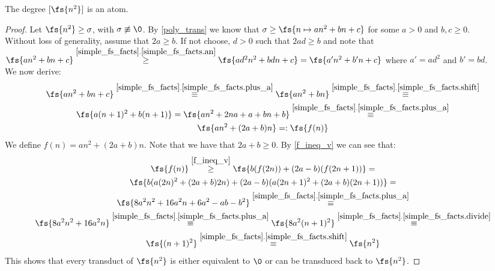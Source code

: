 \begin{theorem}\label{n2_atom}
	The degree $[\fs{n^2}]$ is an atom.
	\begin{proof}
		Let $\fs{n^2} \geq \sigma$, with $\sigma \not\equiv \0$. By \cref{poly_trans} we know that $\sigma \geq \fs{n \mapsto an^2 + bn + c}$ for some $a>0$ and $b,c\geq0$. \\
		
		Without loss of generality, assume that $2a \geq b$. If not choose, $d>0$ such that $2ad \geq b$ and note that $\fs{an^2 + bn+c} \overset{\ref{simple_fs_facts}.\ref{simple_fs_facts.an}}{\geq} \fs{ad^2n^2 + bdn+c} = \fs{a'n^2 + b'n+c}$ where $a' = ad^2$ and $b' = bd$.\\
		
		We now derive:
		\begin{gather*}
			\fs{an^2 + bn + c} \overset{\ref{simple_fs_facts}.\ref{simple_fs_facts.plus_a}}{\equiv}
			\fs{an^2 + bn} \overset{\ref{simple_fs_facts}.\ref{simple_fs_facts.shift}}\equiv \\
			\fs{a(n+1)^2 + b(n+1)} = 
			\fs{an^2 + 2na + a + bn + b} \overset{\ref{simple_fs_facts}.\ref{simple_fs_facts.plus_a}}{\equiv} \\
			\fs{an^2 + (2a + b)n} =: \fs{f(n)}	
		\end{gather*}
		We define $f(n) = an^2 + (2a + b)n$. Note that we have that $2a + b\geq 0$. By \cref{f_ineq_v} we can see that:
		\begin{gather*}
			\fs{f(n)} \overset{\ref{f_ineq_v}}{\geq}
			\fs{b(f(2n)) + (2a-b)(f(2n+1))} = \\
			\fs{b(a(2n)^2 + (2a + b)2n) + (2a-b)(a(2n+1)^2 + (2a + b)(2n + 1))} = \\ 
			\fs{8a^2n^2+16a^2n+6a^2-ab - b^2} \overset{\ref{simple_fs_facts}.\ref{simple_fs_facts.plus_a}}{\equiv} \\ 
			\fs{8a^2n^2+16a^2n} \overset{\ref{simple_fs_facts}.\ref{simple_fs_facts.plus_a}}{\equiv} 
			\fs{8a^2(n+1)^2} \overset{\ref{simple_fs_facts}.\ref{simple_fs_facts.divide}}{\equiv} \\ 
			\fs{(n+1)^2} \overset{\ref{simple_fs_facts}.\ref{simple_fs_facts.shift}}{\equiv}  
			\fs{n^2}
		\end{gather*}
		This shows that every transduct of $\fs{n^2}$ is either equivalent to $\0$ or can be transduced back to $\fs{n^2}$.
	\end{proof}
\end{theorem}